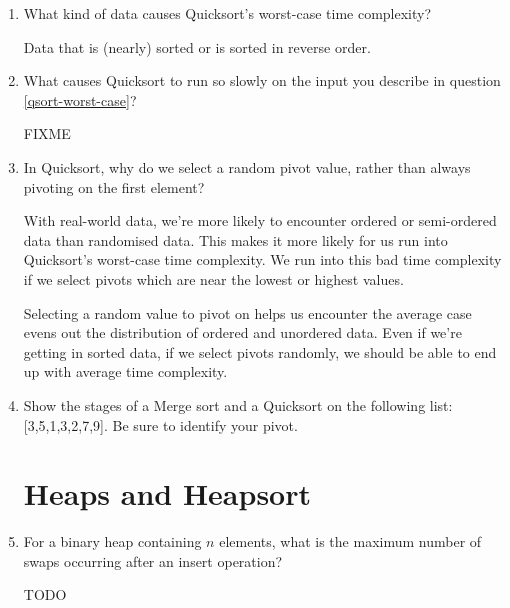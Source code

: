 \documentclass[11pt]{article}
\newenvironment{answer}{\large\lstset{basicstyle=\large}\color{white}}{}
\newenvironment{answer}{\large\lstset{basicstyle=\large}\color{red}}{}
\begin{document}
\begin{enumerate}
\item\label{qsort-worst-case} What kind of data causes Quicksort's worst-case
      time complexity?

      \begin{answer}
      Data that is (nearly) sorted or is sorted in reverse order.
      \end{answer}

\item What causes Quicksort to run so slowly on the input you describe in
      question \ref{qsort-worst-case}?

    \begin{answer}
    {\huge FIXME}
    \end{answer}

\item In Quicksort, why do we select a random pivot value, rather than always
      pivoting on the first element?

      \begin{answer}
      With real-world data, we're more likely to encounter ordered or
      semi-ordered data than randomised data. This makes it more likely for us
      run into Quicksort's worst-case time complexity. We run into this bad
      time complexity if we select pivots which are near the lowest or highest
      values.

      Selecting a random value to pivot on helps us encounter the average case
      evens out the distribution of ordered and unordered data. Even if we're
      getting in sorted data, if we select pivots randomly, we should be able
      to end up with average time complexity.
      \end{answer}

\item Show the stages of a Merge sort and a Quicksort on the following list:
      [3,5,1,3,2,7,9]. Be sure to identify your pivot.

    \begin{answer}
    \end{answer}

\section*{Heaps and Heapsort}

\item For a binary heap containing $n$ elements, what is the maximum number of
      swaps occurring after an insert operation?

    \begin{answer}
    \Huge TODO
    \end{answer}


\end{enumerate}
\end{document}
